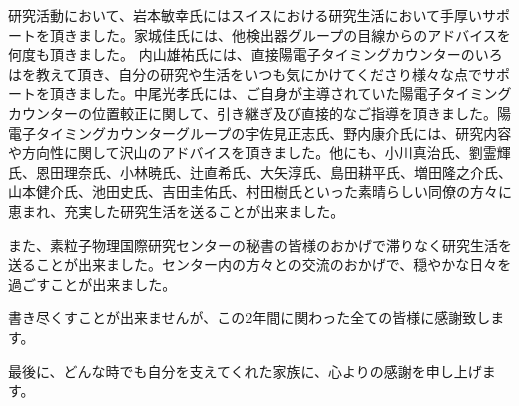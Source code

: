 \documentclass[report]{jsbook}
\begin{document}
研究活動において、岩本敏幸氏にはスイスにおける研究生活において手厚いサポートを頂きました。家城佳氏には、他検出器グループの目線からのアドバイスを何度も頂きました。
内山雄祐氏には、直接陽電子タイミングカウンターのいろはを教えて頂き、自分の研究や生活をいつも気にかけてくださり様々な点でサポートを頂きました。中尾光孝氏には、ご自身が主導されていた陽電子タイミングカウンターの位置較正に関して、引き継ぎ及び直接的なご指導を頂きました。陽電子タイミングカウンターグループの宇佐見正志氏、野内康介氏には、研究内容や方向性に関して沢山のアドバイスを頂きました。他にも、小川真治氏、劉霊輝氏、恩田理奈氏、小林暁氏、辻直希氏、大矢淳氏、島田耕平氏、増田隆之介氏、山本健介氏、池田史氏、吉田圭佑氏、村田樹氏といった素晴らしい同僚の方々に恵まれ、充実した研究生活を送ることが出来ました。

また、素粒子物理国際研究センターの秘書の皆様のおかげで滞りなく研究生活を送ることが出来ました。センター内の方々との交流のおかげで、穏やかな日々を過ごすことが出来ました。

書き尽くすことが出来ませんが、この2年間に関わった全ての皆様に感謝致します。

最後に、どんな時でも自分を支えてくれた家族に、心よりの感謝を申し上げます。


\begin{comment}
\part{付録}
\appendix
\chapter{3D測量機器について}
\label{app: A}
\subsection{測量基準点 (reference point)}
\chapter{軌跡再構成について}
\section{ドリフトチェンバーとのマッチング}
\end{comment}
\end{document}
